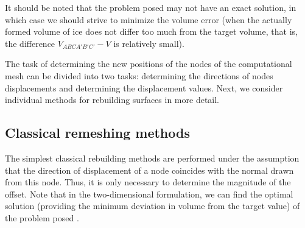 \documentclass[
11pt,
tightenlines,
twoside,
onecolumn,
nofloats,
nobibnotes,
nofootinbib,
superscriptaddress,
noshowpacs,
centertags]
{revtex4-2}
\begin{document}
It should be noted that the problem posed may not have an exact solution, in which case we should strive to minimize the volume error (when the actually formed volume of ice does not differ too much from the target volume, that is, the difference $V_{ABCA'B'C'} - V$ is relatively small).

The task of determining the new positions of the nodes of the computational mesh can be divided into two tasks: determining the directions of nodes displacements and determining the displacement values.
Next, we consider individual methods for rebuilding surfaces in more detail.

\subsection{Classical remeshing methods}

The simplest classical rebuilding methods are performed under the assumption that the direction of displacement of a node coincides with the normal drawn from this node.
Thus, it is only necessary to determine the magnitude of the offset.
Note that in the two-dimensional formulation, we can find the optimal solution (providing the minimum deviation in volume from the target value) of the problem posed \cite{Rybakov_2D}.
\end{document}
